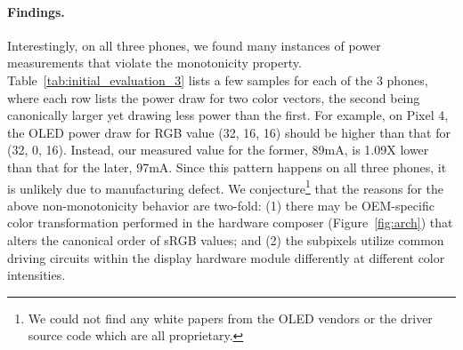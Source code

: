 \paragraph{Findings.}
Interestingly, on all three phones, we found many instances of power
measurements that violate the monotonicity property.  Table~\ref{tab:initial_evaluation_3} lists a few samples for each of the 3
phones, where each row lists the power draw for two color vectors, the
second being canonically larger yet drawing less power than the first.
For example, on Pixel 4, the OLED power draw for RGB value (32, 16, 16) should
be higher than that for (32, 0, 16). Instead,
our measured value for the former, 89mA, 
is 1.09X
lower than that for the later, 97mA.
Since this pattern happens on all three phones,
it is unlikely due to manufacturing defect.
We conjecture\footnote{We could not find any white papers from the OLED vendors
  or the driver source code which are all proprietary.}
that the reasons for the above non-monotonicity behavior
{are two-fold:
(1) there may be OEM-specific color transformation performed
in the hardware composer (Figure~\ref{fig:arch}) that alters the canonical
order of sRGB values;
and
(2) the subpixels utilize
common driving circuits within the display hardware module
differently at different color intensities.
}


